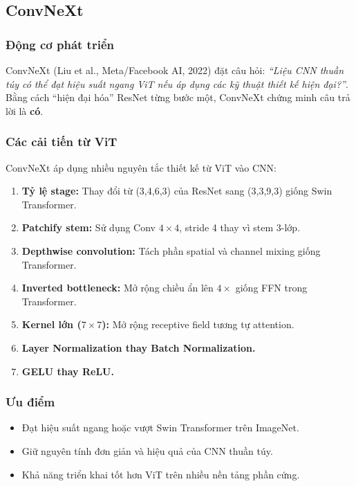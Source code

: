 \subsection{ConvNeXt}
\label{subsec:convnext}

\subsubsection*{Động cơ phát triển}

ConvNeXt \cite{convnext2022} (Liu et al., Meta/Facebook AI, 2022) đặt câu hỏi: \textit{``Liệu CNN thuần túy có thể đạt hiệu suất ngang ViT nếu áp dụng các kỹ thuật thiết kế hiện đại?''}. Bằng cách ``hiện đại hóa'' ResNet từng bước một, ConvNeXt chứng minh câu trả lời là \textbf{có}.

\subsubsection*{Các cải tiến từ ViT}

ConvNeXt áp dụng nhiều nguyên tắc thiết kế từ ViT vào CNN:
\begin{enumerate}
    \item \textbf{Tỷ lệ stage:} Thay đổi từ (3,4,6,3) của ResNet sang (3,3,9,3) giống Swin Transformer.
    \item \textbf{Patchify stem:} Sử dụng Conv $4 \times 4$, stride 4 thay vì stem 3-lớp.
    \item \textbf{Depthwise convolution:} Tách phần spatial và channel mixing giống Transformer.
    \item \textbf{Inverted bottleneck:} Mở rộng chiều ẩn lên $4\times$ giống FFN trong Transformer.
    \item \textbf{Kernel lớn ($7 \times 7$):} Mở rộng receptive field tương tự attention.
    \item \textbf{Layer Normalization thay Batch Normalization.}
    \item \textbf{GELU thay ReLU.}
\end{enumerate}

\subsubsection*{Ưu điểm}
\begin{itemize}
    \item Đạt hiệu suất ngang hoặc vượt Swin Transformer trên ImageNet.
    \item Giữ nguyên tính đơn giản và hiệu quả của CNN thuần túy.
    \item Khả năng triển khai tốt hơn ViT trên nhiều nền tảng phần cứng.
\end{itemize}

